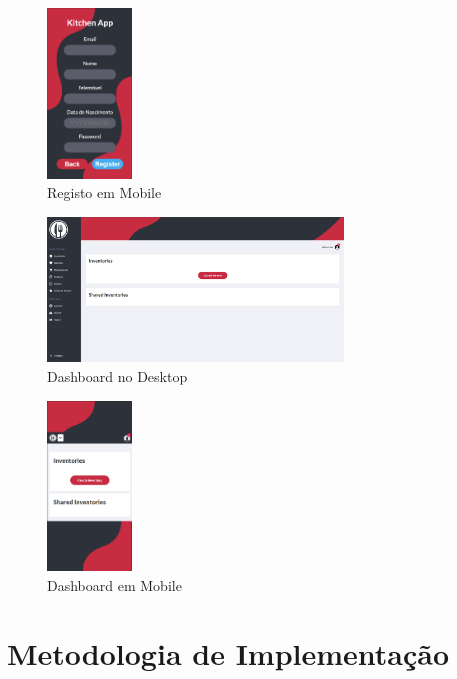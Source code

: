 \documentclass[a4paper]{report}
\begin{document}
    \begin{figure}[H]
    \centering
            \includegraphics[width=0.2\textwidth]{images/mockup/register_mobile.png}
            \caption{Registo em Mobile}
    \end{figure}
    \begin{figure}[H]
    \centering
            \includegraphics[width=0.7\textwidth]{images/mockup/dashboard_desktop.png}
            \caption{Dashboard no Desktop}
    \end{figure}
    \begin{figure}[H]
    \centering
            \includegraphics[width=0.2\textwidth]{images/mockup/dashboard_mobile.png}
            \caption{Dashboard em Mobile}
    \end{figure}
    

\chapter{Metodologia de Implementação}
\end{document}
